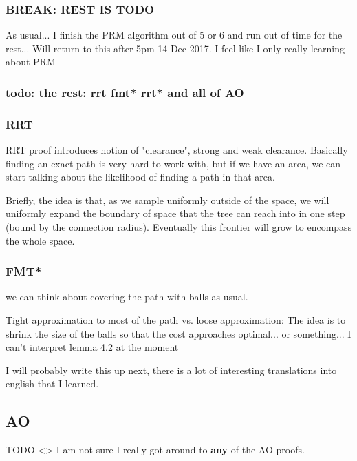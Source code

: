 \documentclass[a4paper]{article}
\begin{document}
\subsubsection{BREAK: REST IS TODO}
As usual... I finish the PRM algorithm out of 5 or 6 and run out of time for the
    rest... Will return to this after 5pm 14 Dec 2017. I feel like I only really
    learning about PRM 

\subsubsection{todo: the rest: rrt fmt* rrt* and all of AO}


\subsubsection{RRT}


    RRT proof \cite{RRT*} introduces notion of "clearance", strong and weak
    clearance. Basically finding an exact path is very hard to work with, but if
    we have an area, we can start talking about the likelihood of finding a path
    in that area.

Briefly, the idea is that, as we sample uniformly outside of the space, we will
uniformly expand the boundary of space that the tree can reach into in one step
    (bound by the connection radius). Eventually this frontier will grow to
    encompass the whole space.

\subsubsection{FMT*}

we can think about covering the path with balls as
usual. 

Tight approximation to most of the path vs. loose approximation:
The idea is to shrink the size of the balls so that the cost approaches
    optimal... or something... I can't interpret lemma 4.2 at the moment


I will probably write this up next, there is a lot of interesting translations
    into english that I learned.

\subsection{AO}

TODO <> %
I am not sure I really got around to \textbf{any} of the AO proofs.
\end{document}
